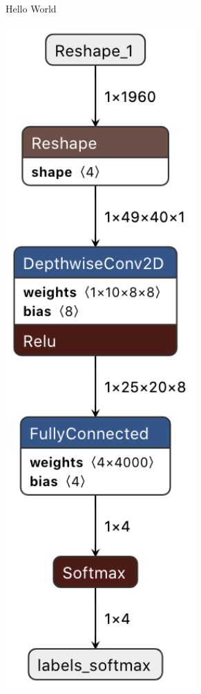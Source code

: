 \documentclass[oneside]{tum-book}
\begin{document}
\begin{figure}[h]
\begin{subfigure}[b]{0.3\textwidth}
         \caption{Hello World}
         \label{fig:netron_hello_world}
     \end{subfigure}
     \hfill
     \begin{subfigure}[b]{0.3\textwidth}
         \centering
         \includegraphics[width=0.8\textwidth]{figures/micro_speech_graph.png}

\end{subfigure}
\end{figure}
\end{document}
